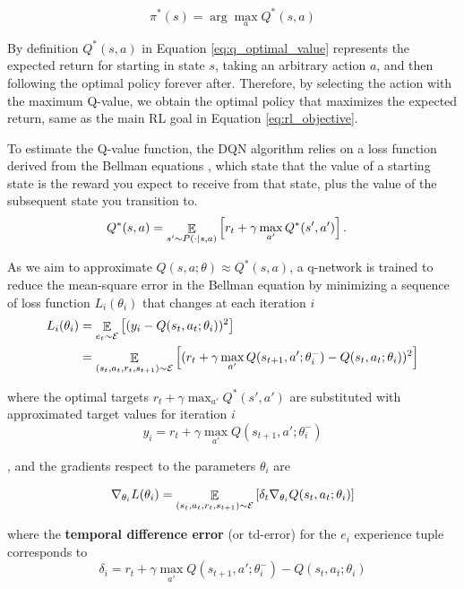 \begin{equation}
    \pi^*(s) = \arg \max_a Q^* (s,a)
    \label{eq:optinal_q_policy}
\end{equation}

By definition $Q^*(s,a)$ in Equation \ref{eq:q_optimal_value} represents the expected return for starting in state $s$, taking an arbitrary action $a$, and then following the optimal policy forever after. Therefore, by selecting the action with the maximum Q-value, we obtain the optimal policy that maximizes the expected return, same as the main RL goal in Equation \ref{eq:rl_objective}.

To estimate the Q-value function, the DQN algorithm relies on a loss function derived from the Bellman equations \cite{sutton2018reinforcement}, which state that the value of a starting state is the reward you expect to receive from that state, plus the value of the subsequent state you transition to.
\begin{align*}
Q^*(s,a) &= \mathop{\mathbb{E}}\limits_{s'\sim P(\cdot | s,a)}\left[r_t + \gamma \max_{a'} Q^*(s',a')\right].
\end{align*}

As we aim to approximate $Q(s, a; \theta) \approx Q^*(s, a)$, a q-network is trained to reduce the mean-square error in the Bellman equation by minimizing a sequence of loss function $L_i(\theta_i)$ that changes at each iteration $i$
\begin{align*}
    L_i (\theta_i) & = \mathop{\mathbb{E}}\limits_{e_t \sim \mathcal{E}}\left[(y_i - Q(s_t, a_t; \theta_i))^2\right] \\
    & = \mathop{\mathbb{E}}\limits_{(s_t, a_t, r_t, s_{t+1}) \sim \mathcal{E}}\left[(r_t + \gamma \max_{a'} Q(s_{t+1}, a'; \theta^-_{i}) - Q(s_t, a_t; \theta_i))^2\right] 
\end{align*}

where the optimal targets $r_t + \gamma \max_{a'} Q^*(s',a')$ are substituted with approximated target values for iteration $i$
\begin{equation}
    y_i = r_t + \gamma \max_{a'} Q(s_{t+1}, a'; \theta^-_{i})
\end{equation}

, and the gradients respect to the parameters $\theta_i$ are

\begin{equation}
    \nabla_{\theta_i} L(\theta_i) = \mathop{\mathbb{E}}\limits_{(s_t, a_t, r_t, s_{t+1}) \sim \mathcal{E}}\left[ \delta_t \nabla_{\theta_i}Q(s_t, a_t; \theta_i)\right] 
\end{equation}

where the \textbf{temporal difference error} (or td-error) for the $e_i$ experience tuple corresponds to
\begin{equation}
    \delta_i = r_t + \gamma \max_{a'} Q(s_{t+1}, a'; \theta^-_{i}) - Q(s_t, a_t; \theta_i)
\end{equation}


